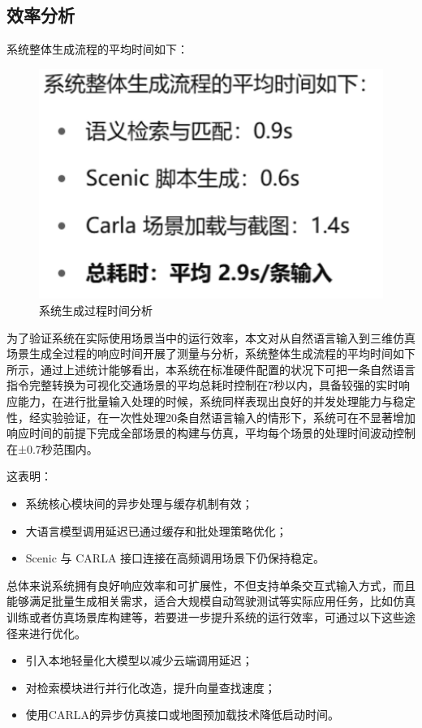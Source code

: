 \subsection{效率分析}
系统整体生成流程的平均时间如下：
\begin{figure}[h]
	\centering
	\includegraphics[width=1.0\textwidth]{"images/picture2.pdf"}
	\caption{系统生成过程时间分析}
	\label{fig:efficiency_analysis}
\end{figure}

为了验证系统在实际使用场景当中的运行效率，本文对从自然语言输入到三维仿真场景生成全过程的响应时间开展了测量与分析，系统整体生成流程的平均时间如下所示，通过上述统计能够看出，本系统在标准硬件配置的状况下可把一条自然语言指令完整转换为可视化交通场景的平均总耗时控制在7秒以内，具备较强的实时响应能力，在进行批量输入处理的时候，系统同样表现出良好的并发处理能力与稳定性，经实验验证，在一次性处理20条自然语言输入的情形下，系统可在不显著增加响应时间的前提下完成全部场景的构建与仿真，平均每个场景的处理时间波动控制在±0.7秒范围内。

这表明：
\begin{itemize}
	\item 系统核心模块间的异步处理与缓存机制有效；
	\item 大语言模型调用延迟已通过缓存和批处理策略优化；
	\item Scenic 与 CARLA 接口连接在高频调用场景下仍保持稳定。
\end{itemize}

总体来说系统拥有良好响应效率和可扩展性，不但支持单条交互式输入方式，而且能够满足批量生成相关需求，适合大规模自动驾驶测试等实际应用任务，比如仿真训练或者仿真场景库构建等，若要进一步提升系统的运行效率，可通过以下这些途径来进行优化。
\begin{itemize}
	\item 引入本地轻量化大模型以减少云端调用延迟；
	\item 对检索模块进行并行化改造，提升向量查找速度；
	\item 使用CARLA的异步仿真接口或地图预加载技术降低启动时间。
\end{itemize}
